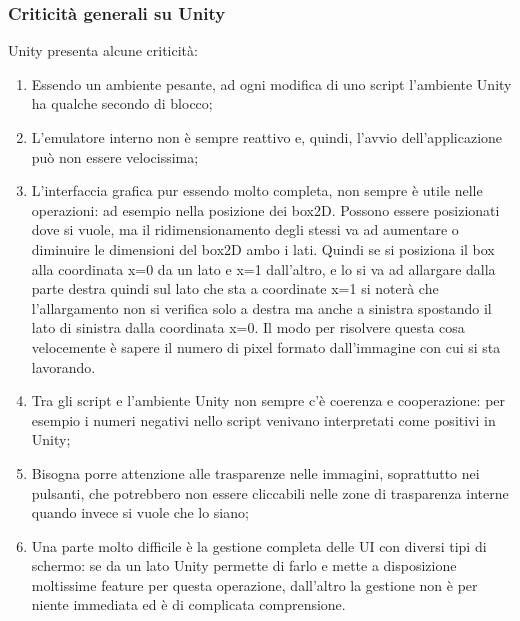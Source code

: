 \subsubsection{Criticità generali su Unity}
Unity presenta alcune criticità:

\begin{enumerate}
\item Essendo un ambiente pesante, ad ogni modifica di uno script l’ambiente Unity ha qualche secondo di blocco;
\item L’emulatore interno non è sempre reattivo e, quindi, l’avvio dell’applicazione può non essere velocissima;
\item L’interfaccia grafica pur essendo molto completa, non sempre è utile nelle operazioni: ad esempio nella posizione dei box2D. Possono essere posizionati dove si vuole, ma il ridimensionamento degli stessi va ad aumentare o diminuire le dimensioni del box2D ambo i lati. Quindi se si posiziona il box alla coordinata x=0 da un lato e x=1 dall’altro, e lo si va ad allargare dalla parte destra quindi sul lato che sta a coordinate x=1 si noterà che l’allargamento non si verifica solo a destra ma anche a sinistra spostando il lato di sinistra dalla coordinata x=0. Il modo per risolvere questa cosa velocemente è sapere il numero di pixel formato dall’immagine con cui si sta lavorando.
\item Tra gli script e l’ambiente Unity non sempre c’è coerenza e cooperazione: per esempio i numeri negativi nello script venivano interpretati come positivi in Unity;
\item Bisogna porre attenzione alle trasparenze nelle immagini, soprattutto nei pulsanti, che potrebbero non essere cliccabili nelle zone di trasparenza interne quando invece si vuole che lo siano;
\item Una parte molto difficile è la gestione completa delle UI con diversi tipi di schermo: se da un lato Unity permette di farlo e mette a disposizione moltissime feature per questa operazione, dall’altro la gestione non è per niente immediata ed è di complicata comprensione.
\end{enumerate}
